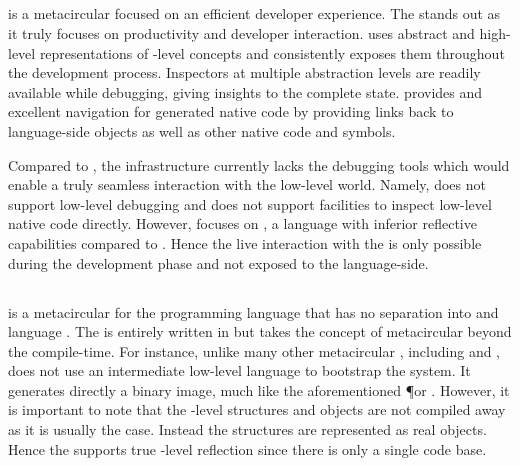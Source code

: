 \subsection{\Maxine \VM}
\Maxine is a metacircular \Java \VM \cite{Wimm13a} focused on an efficient developer experience.
The \Maxine \VM stands out as it truly focuses on productivity and developer interaction.
\Maxine uses abstract and high-level representations of \VM-level concepts and consistently exposes them throughout the development process.
Inspectors at multiple abstraction levels are readily available while debugging, giving insights to the complete \VM state.
\Maxine provides and excellent navigation for generated native code by providing links back to language-side objects as well as other native code and symbols.

Compared to \Maxine, the \B infrastructure currently lacks the debugging tools which would enable a truly seamless interaction with the low-level world.
Namely, \B does not support low-level debugging and does not support facilities to inspect low-level native code directly.
However, \Maxine focuses on \Java, a language with inferior reflective capabilities compared to \PH.
Hence the live interaction with the \VM is only possible during the development phase and not exposed to the language-side.

\subsection{\Klein \VM}
 is a metacircular \VM for the \Self programming language that has no separation into \VM and language \cite{Unga05a}.
The \VM is entirely written in \Self but takes the concept of metacircular beyond the compile-time.
For instance, unlike many other metacircular \VMs, including \Cog and \Squeak, \Klein does not use an intermediate low-level language to bootstrap the system.
It generates directly a binary image, much like the aforementioned \P or \MIST \VM.
However, it is important to note that the \VM-level structures and objects are not compiled away as it is usually the case.
Instead the \VM structures are represented as real \Self objects.
Hence the \Klein \VM supports true \VM-level reflection since there is only a single code base.

